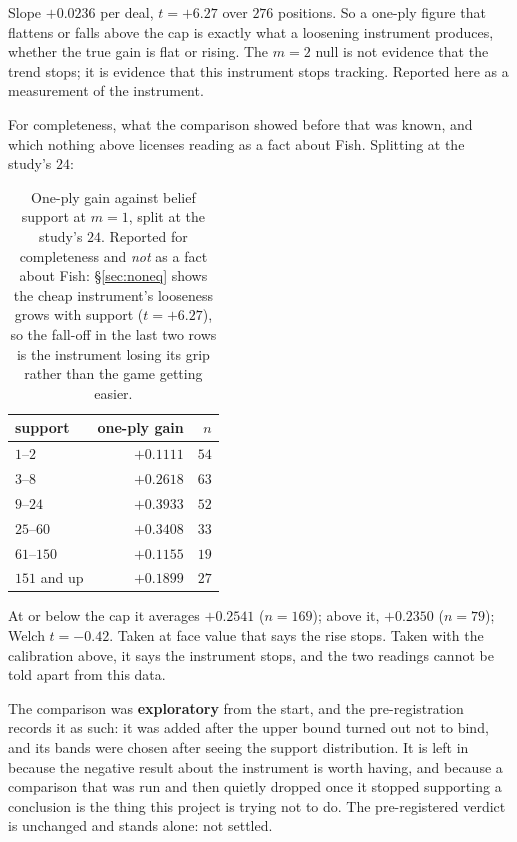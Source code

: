 \documentclass[11pt,letterpaper]{article}
\begin{document}
Slope $+0.0236$ per deal, $t = \mathbf{+6.27}$ over $276$ positions. So a
one-ply figure that flattens or falls above the cap is exactly what a
loosening instrument produces, whether the true gain is flat or rising. The
$m = 2$ null is not evidence that the trend stops; it is evidence that this
instrument stops tracking. Reported here as a measurement of the instrument.

For completeness, what the comparison showed before that was known, and
which nothing above licenses reading as a fact about Fish. Splitting at the
study's $24$:

\begin{table}[t]
\centering
\begin{tabular}{lrr}
\toprule
support & one-ply gain & $n$ \\
\midrule
$1$--$2$      & $+0.1111$ & $54$ \\
$3$--$8$      & $+0.2618$ & $63$ \\
$9$--$24$     & $+0.3933$ & $52$ \\
$25$--$60$    & $+0.3408$ & $33$ \\
$61$--$150$   & $+0.1155$ & $19$ \\
$151$ and up  & $+0.1899$ & $27$ \\
\bottomrule
\end{tabular}
\caption{One-ply gain against belief support at $m = 1$, split at the study's $24$. Reported for completeness and \emph{not} as a fact about Fish: \S\ref{sec:noneq} shows the cheap instrument's looseness grows with support ($t = +6.27$), so the fall-off in the last two rows is the instrument losing its grip rather than the game getting easier.}
\label{tab:support}
\end{table}

At or below the cap it averages $+0.2541$ ($n = 169$); above it, $+0.2350$
($n = 79$); Welch $t = -0.42$. Taken at face value that says the rise stops.
Taken with the calibration above, it says the instrument stops, and the two
readings cannot be told apart from this data.

The comparison was \textbf{exploratory} from the start, and the
pre-registration records it as such: it was added after the upper bound turned
out not to bind, and its bands were chosen after seeing the support
distribution. It is left in because the negative result about the instrument is
worth having, and because a comparison that was run and then quietly dropped
once it stopped supporting a conclusion is the thing this project is trying not
to do. The pre-registered verdict is unchanged and stands alone: not settled.
\end{document}
